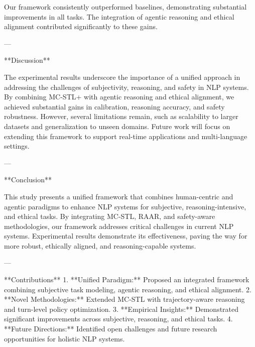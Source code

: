 Our framework consistently outperformed baselines, demonstrating substantial improvements in all tasks. The integration of agentic reasoning and ethical alignment contributed significantly to these gains.

---

**Discussion**

The experimental results underscore the importance of a unified approach in addressing the challenges of subjectivity, reasoning, and safety in NLP systems. By combining MC-STL+ with agentic reasoning and ethical alignment, we achieved substantial gains in calibration, reasoning accuracy, and safety robustness. However, several limitations remain, such as scalability to larger datasets and generalization to unseen domains. Future work will focus on extending this framework to support real-time applications and multi-language settings.

---

**Conclusion**

This study presents a unified framework that combines human-centric and agentic paradigms to enhance NLP systems for subjective, reasoning-intensive, and ethical tasks. By integrating MC-STL, RAAR, and safety-aware methodologies, our framework addresses critical challenges in current NLP systems. Experimental results demonstrate its effectiveness, paving the way for more robust, ethically aligned, and reasoning-capable systems.

---

**Contributions**
1. **Unified Paradigm:** Proposed an integrated framework combining subjective task modeling, agentic reasoning, and ethical alignment.  
2. **Novel Methodologies:** Extended MC-STL with trajectory-aware reasoning and turn-level policy optimization.  
3. **Empirical Insights:** Demonstrated significant improvements across subjective, reasoning, and ethical tasks.  
4. **Future Directions:** Identified open challenges and future research opportunities for holistic NLP systems.